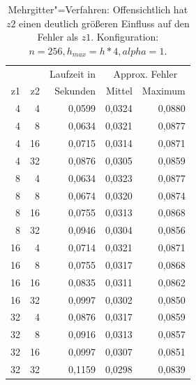 \documentclass[paper = a4]{scrartcl}
\begin{document}
\begin{table}[ht]
    \centering
    \begin{tabular}{|r|r|r|r|r|} \hline
    & & Laufzeit in & \multicolumn{2}{c|}{Approx. Fehler} \\
    z1 & z2 & Sekunden & Mittel & Maximum \\ \hline \hline
    4  & 4  & 0,0599   & 0,0324 & 0,0880  \\
    4  & 8  & 0,0634   & 0,0321 & 0,0877  \\
    4  & 16 & 0,0715   & 0,0314 & 0,0871  \\
    4  & 32 & 0,0876   & 0,0305 & 0,0859  \\ \hline
    8  & 4  & 0,0634   & 0,0323 & 0,0877  \\
    8  & 8  & 0,0674   & 0,0320 & 0,0874  \\
    8  & 16 & 0,0755   & 0,0313 & 0,0868  \\
    8  & 32 & 0,0946   & 0,0304 & 0,0856  \\ \hline
    16 & 4  & 0,0714   & 0,0321 & 0,0871  \\
    16 & 8  & 0,0755   & 0,0317 & 0,0868  \\
    16 & 16 & 0,0835   & 0,0311 & 0,0862  \\
    16 & 32 & 0,0997   & 0,0302 & 0,0850  \\ \hline
    32 & 4  & 0,0876   & 0,0317 & 0,0859  \\
    32 & 8  & 0,0916   & 0,0313 & 0,0857  \\
    32 & 16 & 0,0997   & 0,0307 & 0,0851  \\
    32 & 32 & 0,1159   & 0,0298 & 0,0839  \\ \hline
    \end{tabular}
    \caption{Mehrgitter"=Verfahren: Offensichtlich hat \(z2\) einen deutlich größeren Einfluss auf den Fehler als \(z1\). Konfiguration: \(n=256, h_{max}=h*4, alpha=1\).}
    \label{tab:b}
\end{table}
\end{document}
